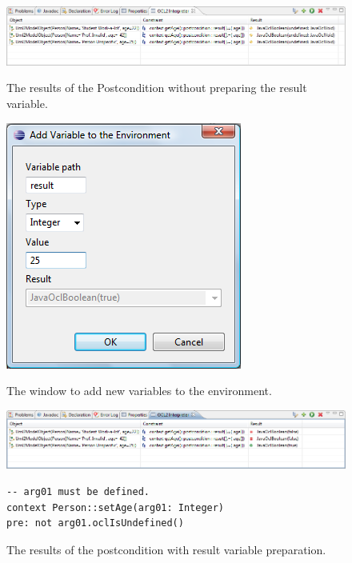 \begin{figure}[!p]
	\centering
	\includegraphics[width=1.0\linewidth]{figures/interpreter/interpret08}
	\caption{The results of the Postcondition without preparing the result
	variable.}
	\label{pic:interpret:interpret08}

  \vspace{3.0em}
	
	\centering
	\includegraphics[width=0.4\linewidth]{figures/interpreter/interpret09}
	\caption{The window to add new variables to the environment.}
	\label{pic:interpret:interpret09}

  \vspace{3.0em}
	
	\centering
	\includegraphics[width=1.0\linewidth]{figures/interpreter/interpret10}
	\caption{The results of the postcondition with result variable preparation.}
	\label{pic:interpret:interpret10}
	
  \vspace{3.0em}

  \lstset{
    language=OCL
  }
  \begin{lstlisting}[caption={An example precondition defined on an operation with argument.}, captionpos=b, label=lst:interpret:precondition]
-- arg01 must be defined.
context Person::setAge(arg01: Integer)
pre: not arg01.oclIsUndefined()
  \end{lstlisting}
\end{figure}

